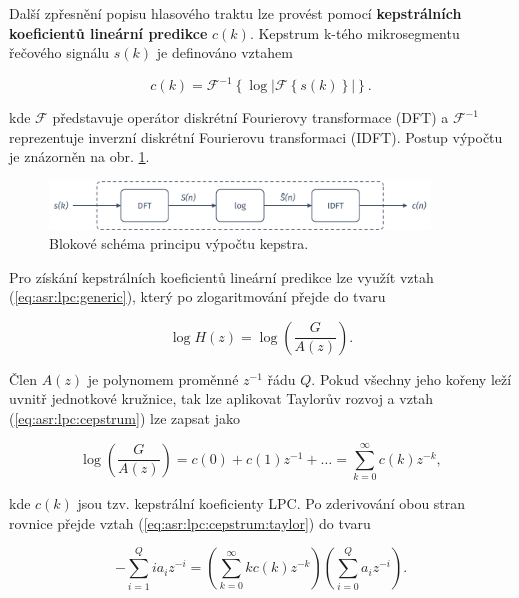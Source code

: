 Další zpřesnění popisu hlasového traktu lze provést pomocí \textbf{kepstrálních koeficientů lineární predikce} $c\left(k\right)$. Kepstrum k-tého mikrosegmentu řečového signálu $s\left(k\right)$ je definováno vztahem %


\begin{equation}
  c(k) = \mathcal{F}^{-1}\left\{\log\left| \mathcal{F}\left\{s(k)\right\} \right|\right\}.
  \label{eq:asr:lpc:cepstrum:generic}
\end{equation}

\noindent kde $\mathcal{F}$ představuje operátor diskrétní Fourierovy transformace (DFT) a $\mathcal{F}^{-1}$ reprezentuje inverzní diskrétní Fourierovu transformaci (IDFT). Postup výpočtu je znázorněn na obr. \ref{fig:asr:model:speech:cepstrum}.

\begin{figure}[hbpt]
  \centering
  \includegraphics[width=0.9\textwidth]{./ch4-asr/img/cepstrum.pdf}
  \caption{Blokové schéma principu výpočtu kepstra.}
  \label{fig:asr:model:speech:cepstrum}
\end{figure}

Pro získání kepstrálních koeficientů lineární predikce lze využít vztah (\ref{eq:asr:lpc:generic}), který po zlogaritmování přejde do tvaru

\begin{equation}
  \log H(z) = \log \left( \frac{G}{A(z)} \right).
  \label{eq:asr:lpc:cepstrum}
\end{equation}

\noindent Člen $A(z)$ je polynomem proměnné $z^{-1}$ řádu $Q$. Pokud všechny jeho kořeny leží uvnitř jednotkové kružnice, tak lze aplikovat Taylorův rozvoj a vztah (\ref{eq:asr:lpc:cepstrum}) lze zapsat jako

\begin{equation}
  \log \left( \frac{G}{A(z)} \right) = c(0) + c(1)z^{-1} + \dots = \sum_{k=0}^{\infty} c(k)z^{-k},
  \label{eq:asr:lpc:cepstrum:taylor}
\end{equation}

\noindent kde $c(k)$ jsou tzv. kepstrální koeficienty LPC. Po zderivování obou stran rovnice přejde vztah (\ref{eq:asr:lpc:cepstrum:taylor}) do tvaru

\begin{equation}
  - \sum_{i=1}^{Q} ia_iz^{-i} = \left( \sum_{k=0}^{\infty} kc(k)z^{-k} \right)\left( \sum_{i=0}^{Q} a_iz^{-i}\right).
  \label{eq:asr:lpc:cepstrum:deriv}
\end{equation}

